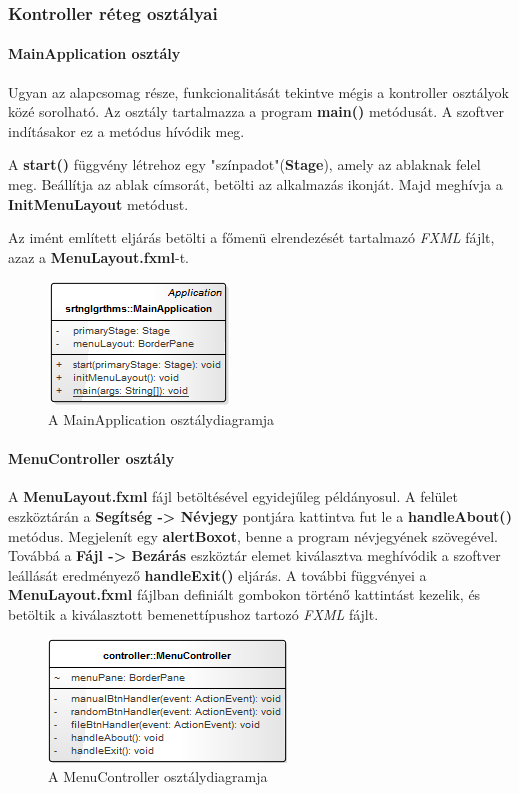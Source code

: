 \documentclass{elteikthesis}
\begin{document}
\subsubsection{Kontroller réteg osztályai}
\paragraph{MainApplication osztály}
Ugyan az alapcsomag része, funkcionalitását tekintve mégis a kontroller osztályok közé sorolható. Az osztály tartalmazza a program \textbf{main()} metódusát. A szoftver indításakor ez a metódus hívódik meg.\par
A \textbf{start()} függvény létrehoz egy "színpadot"(\textbf{Stage}), amely az ablaknak felel meg. Beállítja az ablak címsorát, betölti az alkalmazás ikonját. Majd meghívja a \textbf{InitMenuLayout} metódust.\par
Az imént említett eljárás betölti a főmenü elrendezését tartalmazó \emph{FXML} fájlt, azaz a \textbf{MenuLayout.fxml}-t.
\begin{figure}[H]
	\centering
	\includegraphics{pics/class/MainApplication.png}
	\caption{A MainApplication osztálydiagramja}
\end{figure}
\paragraph{MenuController osztály}
A \textbf{MenuLayout.fxml} fájl betöltésével egyidejűleg példányosul. A felület eszköztárán a \textbf{Segítség -> Névjegy} pontjára kattintva fut le a \textbf{handleAbout()} metódus. Megjelenít egy \textbf{alertBoxot}, benne a program névjegyének szövegével. Továbbá a \textbf{Fájl -> Bezárás} eszköztár elemet kiválasztva meghívódik a szoftver leállását eredményező \textbf{handleExit()} eljárás. A további függvényei a \textbf{MenuLayout.fxml} fájlban definiált gombokon történő kattintást kezelik, és betöltik a kiválasztott bemenettípushoz tartozó \emph{FXML} fájlt.
\begin{figure}[H]
	\centering
	\includegraphics{pics/class/MenuController.png}
	\caption{A MenuController osztálydiagramja}
\end{figure}
\end{document}
